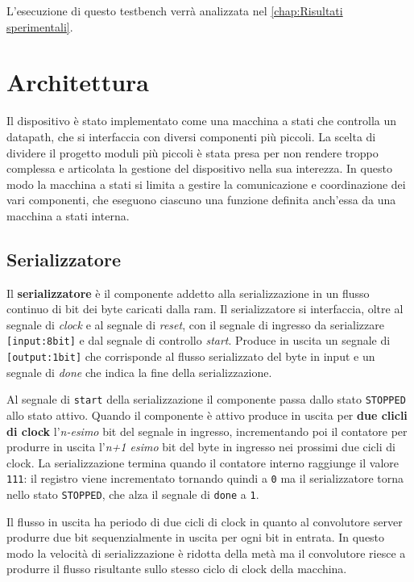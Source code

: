 \documentclass[a4paper]{report}
\begin{document}
L'esecuzione di questo testbench verrà analizzata nel \autoref{chap:Risultati sperimentali}.


\chapter{Architettura}
Il dispositivo è stato implementato come una macchina a stati che controlla un datapath, che si interfaccia con diversi componenti più piccoli. La scelta di dividere il progetto moduli più piccoli è stata presa per non rendere troppo complessa e articolata la gestione del dispositivo nella sua interezza. In questo modo la macchina a stati si limita a gestire la comunicazione e coordinazione dei vari componenti, che eseguono ciascuno una funzione definita anch'essa da una macchina a stati interna.

\section{Serializzatore}

Il \textbf{serializzatore} è il componente addetto alla serializzazione in un flusso continuo di bit dei byte caricati dalla ram.
Il serializzatore si interfaccia, oltre al segnale di \textit{clock} e al segnale di \textit{reset}, con il segnale di ingresso da serializzare \texttt{[input:8bit]} e dal segnale di controllo \textit{start}. Produce in uscita un segnale di \texttt{[output:1bit]} che corrisponde al flusso serializzato del byte in input e un segnale di \textit{done} che indica la fine della serializzazione.

Al segnale di \texttt{start} della serializzazione il componente passa dallo stato \texttt{STOPPED} allo stato attivo. Quando il componente è attivo produce in uscita per \textbf{due clicli di clock} l'\textit{n-esimo} bit del segnale in ingresso, incrementando poi il contatore per produrre in uscita l'\textit{n+1 esimo} bit del byte in ingresso nei prossimi due cicli di clock. La serializzazione termina quando il contatore interno raggiunge il valore \texttt{111}: il registro viene incrementato tornando quindi a \texttt{0} ma il serializzatore torna nello stato \texttt{STOPPED}, che alza il segnale di \texttt{done} a \texttt{1}.

Il flusso in uscita ha periodo di due cicli di clock in quanto al convolutore server produrre due bit sequenzialmente in uscita per ogni bit in entrata. In questo modo la velocità di serializzazione è ridotta della metà ma il convolutore riesce a produrre il flusso risultante sullo stesso ciclo di clock della macchina.
\end{document}
